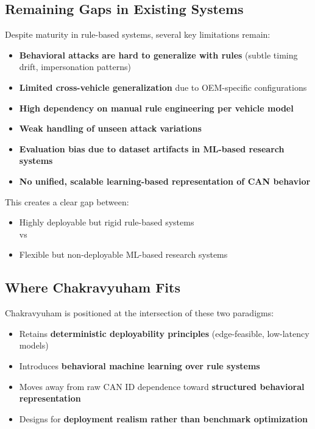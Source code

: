 \documentclass{article}
\begin{document}
\subsection{Remaining Gaps in Existing Systems}
Despite maturity in rule-based systems, several key limitations remain:
\begin{itemize}[noitemsep]
    \item \textbf{Behavioral attacks are hard to generalize with rules} (subtle timing drift, impersonation patterns)
    \item \textbf{Limited cross-vehicle generalization} due to OEM-specific configurations
    \item \textbf{High dependency on manual rule engineering per vehicle model}
    \item \textbf{Weak handling of unseen attack variations}
    \item \textbf{Evaluation bias due to dataset artifacts in ML-based research systems}
    \item \textbf{No unified, scalable learning-based representation of CAN behavior}
\end{itemize}

This creates a clear gap between:
\begin{itemize}[noitemsep]
    \item Highly deployable but rigid rule-based systems \\
    vs
    \item Flexible but non-deployable ML-based research systems
\end{itemize}

\subsection{Where Chakravyuham Fits}
Chakravyuham is positioned at the intersection of these two paradigms:
\begin{itemize}[noitemsep]
    \item Retains \textbf{deterministic deployability principles} (edge-feasible, low-latency models)
    \item Introduces \textbf{behavioral machine learning over rule systems}
    \item Moves away from raw CAN ID dependence toward \textbf{structured behavioral representation}
    \item Designs for \textbf{deployment realism rather than benchmark optimization}
\end{itemize}
\end{document}
